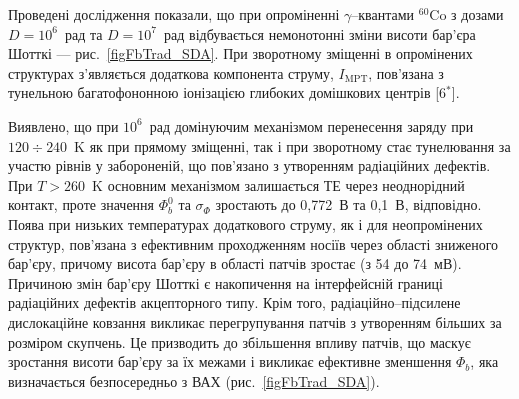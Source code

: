 Проведені дослідження показали, що при
опроміненні $\gamma$--квантами $^{60}$Co з дозами $D\!=\!10^6$~рад та $D\!=\!10^7$~рад відбувається
немонотонні зміни висоти бар'єра Шотткі --- рис.~\ref{figFbTrad_SDA}.
При зворотному зміщенні в опромінених структурах з'являється додаткова компонента струму, $I_\mathrm{MPT}$,
пов'язана з тунельною багатофононною іонізацією глибоких домішкових центрів
[6$^*$].

Виявлено, що при $10^6$~рад домінуючим механізмом перенесення заряду при $120\div240$~K як при прямому зміщенні, так і при зворотному стає тунелювання за участю рівнів у забороненій, що пов'язано з утворенням радіаційних дефектів.
При $T>260$~K основним механізмом залишається ТЕ через неоднорідний контакт, проте значення $\Phi_b^0$ та $\sigma_{\Phi}$
зростають до 0,772~В та 0,1~В, відповідно.
Поява при низьких температурах додаткового струму, як і для неопромінених структур, пов'язана з ефективним проходженням носіїв через області зниженого бар'єру, причому висота бар'єру в області патчів зростає (з 54 до 74~мВ).
Причиною змін бар'єру Шотткі є накопичення на інтерфейсній границі радіаційних дефектів акцепторного типу.
Крім того, радіаційно--підсилене дислокаційне ковзання викликає  перегрупування патчів з утворенням більших за розміром скупчень.
Це призводить до збільшення впливу патчів, що  маскує зростання висоти бар'єру за їх межами і викликає ефективне зменшення $\Phi_b$, яка визначається безпосередньо з ВАХ (рис.~\ref{figFbTrad_SDA}).

